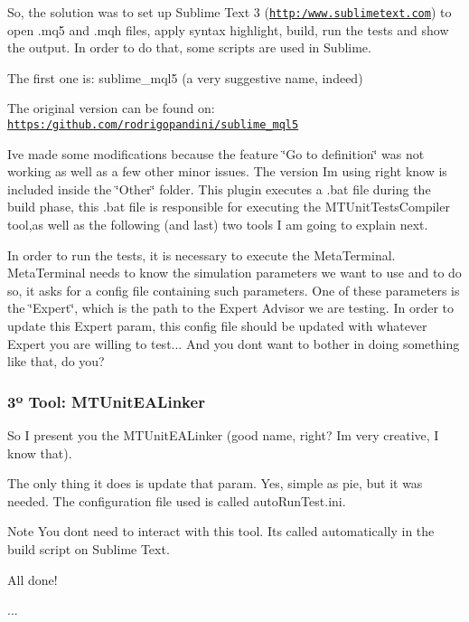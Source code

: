 So, the solution was to set up Sublime Text 3 (\href{http:/www.sublimetext.com}{\tt http\+:/www.\+sublimetext.\+com}) to open .mq5 and .mqh files, apply syntax highlight, build, run the tests and show the output. In order to do that, some scripts are used in Sublime.

The first one is\+: sublime\+\_\+mql5 (a very suggestive name, indeed)

The original version can be found on\+: \href{https:/github.com/rodrigopandini/sublime_mql5}{\tt https\+:/github.\+com/rodrigopandini/sublime\+\_\+mql5}

I\textquotesingle{}ve made some modifications because the feature \char`\"{}\+Go to definition\char`\"{} was not working as well as a few other minor issues. The version I\textquotesingle{}m using right know is included inside the \char`\"{}\+Other\char`\"{} folder. This plugin executes a .bat file during the build phase, this .bat file is responsible for executing the M\+T\+Unit\+Tests\+Compiler tool,as well as the following (and last) two tools I am going to explain next.

In order to run the tests, it is necessary to execute the Meta\+Terminal. Meta\+Terminal needs to know the simulation parameters we want to use and to do so, it asks for a config file containing such parameters. One of these parameters is the \char`\"{}\+Expert\char`\"{}, which is the path to the Expert Advisor we are testing. In order to update this Expert param, this config file should be updated with whatever Expert you are willing to test... And you don\textquotesingle{}t want to bother in doing something like that, do you?

\subsubsection*{3º Tool\+: M\+T\+Unit\+E\+A\+Linker}

So I present you the M\+T\+Unit\+E\+A\+Linker (good name, right? I\textquotesingle{}m very creative, I know that).

The only thing it does is update that param. Yes, simple as pie, but it was needed. The configuration file used is called auto\+Run\+Test.\+ini. \begin{DoxyNote}{Note}
You don\textquotesingle{}t need to interact with this tool. It\textquotesingle{}s called automatically in the build script on Sublime Text.
\end{DoxyNote}
All done!

...

